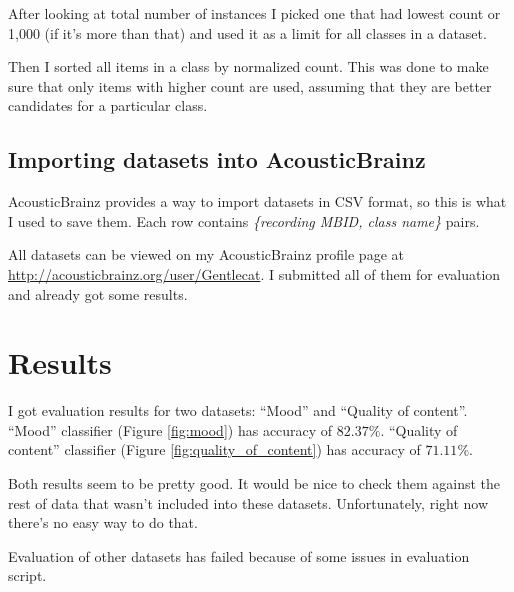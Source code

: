 \documentclass{scrartcl}
\begin{document}
After looking at total number of instances I picked one that had lowest count or 1,000 (if it's more than that) and used it as a limit for all classes in a dataset.

Then I sorted all items in a class by normalized count. This was done to make sure that only items with higher count are used, assuming that they are better candidates for a particular class.

\subsection{Importing datasets into AcousticBrainz}

AcousticBrainz provides a way to import datasets in CSV format, so this is what I used to save them. Each row contains \textit{\{recording MBID, class name\}} pairs.

All datasets can be viewed on my AcousticBrainz profile page at \url{http://acousticbrainz.org/user/Gentlecat}. I submitted all of them for evaluation and already got some results.


\section{Results}

I got evaluation results for two datasets: ``Mood'' and ``Quality of content''. ``Mood'' classifier (Figure \ref{fig:mood}) has accuracy of $82.37\%$. ``Quality of content'' classifier (Figure \ref{fig:quality_of_content}) has accuracy of $71.11\%$. 

\begin{figure}[!h]
    \begin{floatrow}
    \end{floatrow}
\end{figure}

Both results seem to be pretty good. It would be nice to check them against the rest of data that wasn't included into these datasets. Unfortunately, right now there's no easy way to do that.

Evaluation of other datasets has failed because of some issues in evaluation script.
\end{document}
